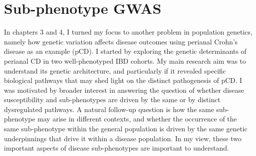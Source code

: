 
\section{Sub-phenotype GWAS}
In chapters 3 and 4, I turned my focus to another problem in population genetics, namely how genetic variation affects disease outcomes using perianal Crohn's disease as an example (pCD). I started by exploring the genetic determinants of perianal CD in two well-phenotyped IBD cohorts. My main research aim was to understand its genetic architecture, and particularly if it revealed specific biological pathways that may shed light on the distinct pathogenesis of pCD. I was motivated by broader interest in answering the question of whether disease susceptibility and sub-phenotypes are driven by the same or by distinct dysregulated pathways. A natural follow-up question is how the same sub-phenotype may arise in different contexts, and whether the occurrence of the same sub-phenotype within the general population is driven by the same genetic underpinnings that drive it within a disease population. In my view, these two important aspects of disease sub-phenotypes are important to understand.  


